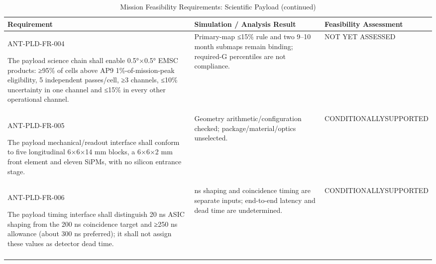 \begin{table}[H]\centering\small\setlength{\tabcolsep}{3pt}
\ContinuedFloat\captionsetup{list=no}
\caption{Mission Feasibility Requirements: Scientific Payload (continued)}
\begin{tabular}{@{}
>{\RaggedRight\arraybackslash}p{}
>{\RaggedRight\arraybackslash}p{}
>{\RaggedRight\arraybackslash}p{}
@{}}
\toprule Requirement & Simulation / Analysis Result & Feasibility Assessment\\\midrule
{}\label{req:ANT-PLD-FR-004}\mbox{ANT-PLD-}\newline\mbox{FR-004}\par The payload science chain shall enable 0.5°×0.5° EMSC products: ≥95\% of cells above AP9 1\%-of-mission-peak eligibility, 5 independent passes/cell, ≥3 channels, ≤10\% uncertainty in one channel and ≤15\% in every other operational channel. & Primary-map ≤15\% rule and two 9–10 month submaps remain binding; required-G percentiles are not compliance. & NOT YET ASSESSED\\
\addlinespace[3pt]
\label{req:ANT-PLD-FR-005}\mbox{ANT-PLD-}\newline\mbox{FR-005}\par The payload mechanical/readout interface shall conform to five longitudinal 6×6×14 mm blocks, a 6×6×2 mm front element and eleven SiPMs, with no silicon entrance stage. & Geometry arithmetic/configuration checked; package/material/optics unselected. & CONDITIONALLY\newline SUPPORTED\\
\addlinespace[3pt]
\label{req:ANT-PLD-FR-006}\mbox{ANT-PLD-}\newline\mbox{FR-006}\par The payload timing interface shall distinguish 20 ns ASIC shaping from the 200 ns coincidence target and ≥250 ns allowance (about 300 ns preferred); it shall not assign these values as detector dead time. & 20 ns shaping and coincidence timing are separate inputs; end-to-end latency and dead time are undetermined. & CONDITIONALLY\newline SUPPORTED\\
\addlinespace[3pt]
\bottomrule
\end{tabular}
\end{table}
